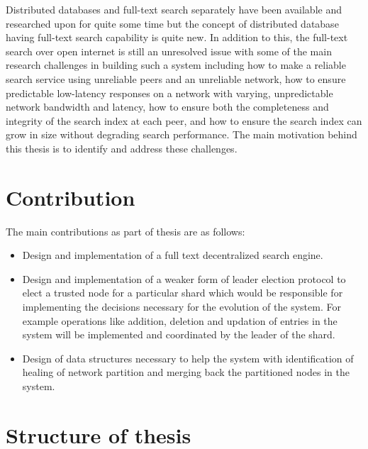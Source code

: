 \documentclass[a4paper,11pt]{kth-mag}
\begin{document}
Distributed databases and full-text search separately have been available and researched upon for quite some time but the concept of distributed database having full-text search capability is quite new. In addition to this, the full-text search over open internet is still an unresolved issue with some of the main research challenges in building such a system including how to make a reliable search service using unreliable peers and an unreliable network, how to ensure predictable low-latency responses on a network with varying, unpredictable network bandwidth and latency, how to ensure both the completeness and integrity of the search index at each peer, and how to ensure the search index can grow in size without degrading search performance. The main motivation behind this thesis is to identify and address these challenges.



\section{Contribution}
\label{sec: contribution}

The main contributions as part of thesis are as follows:

\begin{itemize}
	\item Design and implementation of a full text decentralized search engine.
	\item Design and implementation of a weaker form of leader election protocol to elect a trusted node for a particular shard which would be responsible for implementing the decisions necessary for the evolution of the system. For example operations like addition, deletion and updation of entries in the system will be implemented and coordinated by the leader of the shard.
	\item Design of data structures necessary to help the system with identification of healing of network partition and merging back the partitioned nodes in the system.

\end{itemize}



\section{Structure of thesis}
\label{sec:thesis_structure}
\end{document}
